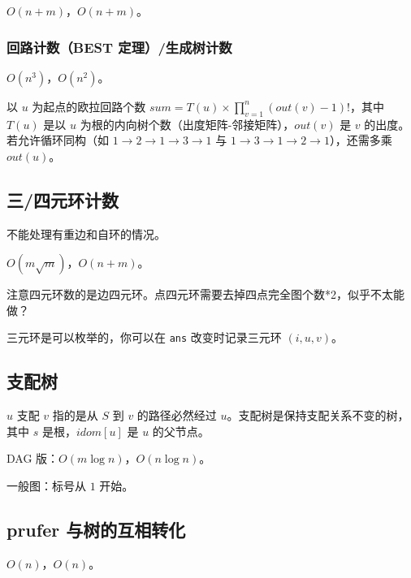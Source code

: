 \documentclass[12pt]{ctexart}
\begin{document}
$O(n+m)$，$O(n+m)$。



\subsubsection{回路计数（BEST 定理）/生成树计数}

$O(n^3)$，$O(n^2)$。

以 $u$ 为起点的欧拉回路个数 $sum=T(u)\times \prod\limits_{v=1}^n(out(v)-1)!$，其中 $T(u)$ 是以 $u$ 为根的内向树个数（出度矩阵-邻接矩阵），$out(v)$ 是 $v$ 的出度。若允许循环同构（如 $1\to 2\to 1\to 3\to 1$ 与 $1\to 3\to 1\to 2\to 1$），还需多乘 $out(u)$。




\subsection{三/四元环计数}

不能处理有重边和自环的情况。

$O(m\sqrt m)$，$O(n+m)$。

注意四元环数的是边四元环。点四元环需要去掉四点完全图个数*2，似乎不太能做？

三元环是可以枚举的，你可以在 \verb|ans| 改变时记录三元环 $(i,u,v)$。



\subsection{支配树}

$u$ 支配 $v$ 指的是从 $S$ 到 $v$ 的路径必然经过 $u$。支配树是保持支配关系不变的树，其中 $s$ 是根，$idom[u]$ 是 $u$ 的父节点。

DAG 版：$O(m\log n)$，$O(n\log n)$。



一般图：标号从 $1$ 开始。



\subsection{prufer 与树的互相转化}

$O(n)$，$O(n)$。


\end{document}
